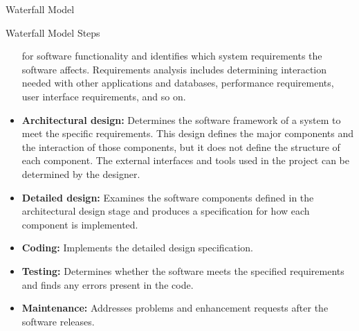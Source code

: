 \documentclass[final,hyperref={pdfpagelabels=false}]{beamer}
\begin{document}
\begin{frame}{ Waterfall Model}
\begin{block}{\large Waterfall Model Steps}
\begin{itemize}
                for software functionality and identifies which system
                requirements the software affects. Requirements
                analysis includes determining interaction needed with
                other applications and databases, performance
                requirements, user interface requirements, and so on.
            \item \textbf{ Architectural design:} Determines the software
                framework of a system to meet the specific
                requirements. This design defines the major
                components and the interaction of those components,
                but it does not define the structure of each
                component. The external interfaces and tools used in
                the project can be determined by the designer.
            \item \textbf{ Detailed design:} Examines the software components
                defined in the architectural design stage and produces
                a specification for how each component is
                implemented.
            \item \textbf{ Coding:} Implements the detailed design
                specification.
            \item \textbf{ Testing:} Determines whether the software meets the
                specified requirements and finds any errors present in
                the code.
            \item \textbf{ Maintenance:} Addresses problems and enhancement
                requests after the software releases.
        \end{itemize}
        

\end{block}
\end{frame}
\end{document}
